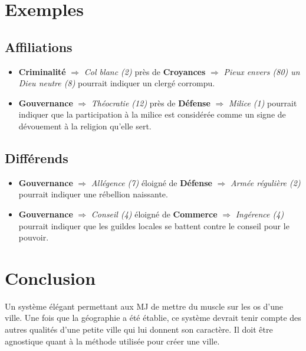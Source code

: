 \documentclass{article}
\begin{document}
\section*{Exemples}

\subsection*{Affiliations}
\begin{itemize}
	\item \textbf{Criminalité} $\Rightarrow$ \textit{Col blanc (2)} près de \textbf{Croyances} $\Rightarrow$ \textit{Pieux envers (80) un Dieu neutre (8)} pourrait indiquer un clergé corrompu. 
	\item \textbf{Gouvernance} $\Rightarrow$ \textit{Théocratie (12)} près de \textbf{Défense} $\Rightarrow$ \textit{Milice (1)} pourrait indiquer que la participation à la milice est considérée comme un signe de dévouement à la religion qu'elle sert.
\end{itemize}

\subsection*{Différends}
\begin{itemize}
	\item \textbf{Gouvernance} $\Rightarrow$ \textit{Allégence (7)} éloigné de \textbf{Défense} $\Rightarrow$ \textit{Armée régulière (2)} pourrait indiquer une rébellion naissante. 
	\item \textbf{Gouvernance} $\Rightarrow$ \textit{Conseil (4)} éloigné de \textbf{Commerce} $\Rightarrow$ \textit{Ingérence (4)} pourrait indiquer que les guildes locales se battent contre le conseil pour le pouvoir.
\end{itemize}

\clearpage

\section*{Conclusion}
Un système élégant permettant aux MJ de mettre du muscle sur les os d'une ville. Une fois que la géographie a été établie, ce système devrait tenir compte des autres qualités d'une petite ville qui lui donnent son caractère. Il doit être agnostique quant à la méthode utilisée pour créer une ville.
\end{document}
